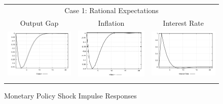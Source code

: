 \begin{figure}
\caption{Monetary Policy Shock Impulse Responses}\label{fg:irf_mp}
\vspace*{1pc}
\begin{tabular}{ccc}
\multicolumn{3}{c}{Case 1: Rational Expectations}\\
Output Gap & Inflation & Interest Rate \\ 
\includegraphics[scale=0.28]{results_re/Output_mpshock_irf.png} & 
\includegraphics[scale=0.28]{results_re/Inflation_mpshock_irf.png} & 
\includegraphics[scale=0.28]{results_re/Interest_Rate_mpshock_irf.png} \\ \\ 

\end{tabular}
\end{figure}
